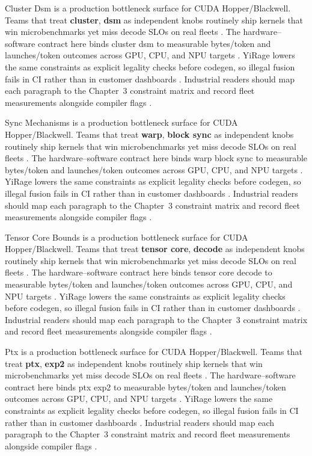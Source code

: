 Cluster Dsm is a production bottleneck surface for CUDA Hopper/Blackwell. Teams that treat \textbf{cluster}, \textbf{dsm} as independent knobs routinely ship kernels that win microbenchmarks yet miss decode SLOs on real fleets \citep{nvidia2022hopper,amd2024aie}. The hardware--software contract here binds cluster dsm to measurable bytes/token and launches/token outcomes across GPU, CPU, and NPU targets \citep{semianalysis2024tma,dlbook}. YiRage lowers the same constraints as explicit legality checks before codegen, so illegal fusion fails in CI rather than in customer dashboards \citep{amd2024xdna,dao2022flashattention}. Industrial readers should map each paragraph to the Chapter~3 constraint matrix and record fleet measurements alongside compiler flags \citep{amd2024aie,kwon2023vllm}.

Sync Mechanisms is a production bottleneck surface for CUDA Hopper/Blackwell. Teams that treat \textbf{warp}, \textbf{block sync} as independent knobs routinely ship kernels that win microbenchmarks yet miss decode SLOs on real fleets \citep{semianalysis2024tma,dlbook}. The hardware--software contract here binds warp block sync to measurable bytes/token and launches/token outcomes across GPU, CPU, and NPU targets \citep{amd2024xdna,dao2022flashattention}. YiRage lowers the same constraints as explicit legality checks before codegen, so illegal fusion fails in CI rather than in customer dashboards \citep{amd2024aie,kwon2023vllm}. Industrial readers should map each paragraph to the Chapter~3 constraint matrix and record fleet measurements alongside compiler flags \citep{dlbook,nvidia2024cudagraphs}.

Tensor Core Bounds is a production bottleneck surface for CUDA Hopper/Blackwell. Teams that treat \textbf{tensor core}, \textbf{decode} as independent knobs routinely ship kernels that win microbenchmarks yet miss decode SLOs on real fleets \citep{amd2024xdna,dao2022flashattention}. The hardware--software contract here binds tensor core decode to measurable bytes/token and launches/token outcomes across GPU, CPU, and NPU targets \citep{amd2024aie,kwon2023vllm}. YiRage lowers the same constraints as explicit legality checks before codegen, so illegal fusion fails in CI rather than in customer dashboards \citep{dlbook,nvidia2024cudagraphs}. Industrial readers should map each paragraph to the Chapter~3 constraint matrix and record fleet measurements alongside compiler flags \citep{dao2022flashattention,liu2024deepseekv3}.

Ptx is a production bottleneck surface for CUDA Hopper/Blackwell. Teams that treat \textbf{ptx}, \textbf{exp2} as independent knobs routinely ship kernels that win microbenchmarks yet miss decode SLOs on real fleets \citep{amd2024aie,kwon2023vllm}. The hardware--software contract here binds ptx exp2 to measurable bytes/token and launches/token outcomes across GPU, CPU, and NPU targets \citep{dlbook,nvidia2024cudagraphs}. YiRage lowers the same constraints as explicit legality checks before codegen, so illegal fusion fails in CI rather than in customer dashboards \citep{dao2022flashattention,liu2024deepseekv3}. Industrial readers should map each paragraph to the Chapter~3 constraint matrix and record fleet measurements alongside compiler flags \citep{kwon2023vllm,patel2025llminference}.

